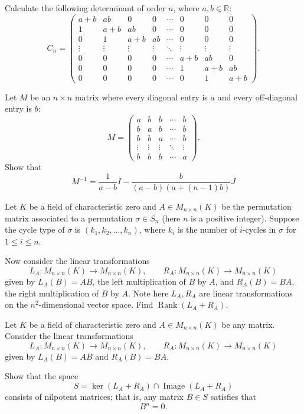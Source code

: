\documentclass[12pt]{article}
\begin{document}
\begin{problem}
Calculate the following determinant of order $n$, where $a,b\in\mathbb{R}$:
\[
C_n=\begin{pmatrix}
a+b & ab & 0 & 0 & \cdots & 0 & 0 & 0\\
1 & a+b & ab & 0 & \cdots & 0 & 0 & 0\\
0 & 1 & a+b & ab & \cdots & 0 & 0 & 0\\
\vdots & \vdots & \vdots & \vdots & \ddots & \vdots & \vdots & \vdots\\
0 & 0 & 0 & 0 & \cdots & a+b & ab & 0\\
0 & 0 & 0 & 0 & \cdots & 1 & a+b & ab\\
0 & 0 & 0 & 0 & \cdots & 0 & 1 & a+b
\end{pmatrix}.
\]
\end{problem}

\begin{problem}
Let $M$ be an $n\times n$ matrix where every diagonal entry is $a$ and every off-diagonal entry is $b$:
\[
M=\begin{pmatrix}
a & b & b & \cdots & b\\
b & a & b & \cdots & b\\
b & b & a & \cdots & b\\
\vdots & \vdots & \vdots & \ddots & \vdots\\
b & b & b & \cdots & a
\end{pmatrix}.
\]
Show that
\[
M^{-1} = \frac{1}{a-b}I - \frac{b}{(a-b)(a+(n-1)b)}J
\]
\end{problem}

\begin{problem}
Let $K$ be a field of characteristic zero and $A\in M_{n\times n}(K)$ be the permutation
matrix associated to a permutation $\sigma\in S_n$ (here $n$ is a positive integer).
Suppose the cycle type of $\sigma$ is $(k_1,k_2,\ldots,k_n)$, where $k_i$ is the number
of $i$-cycles in $\sigma$ for $1\le i\le n$.

Now consider the linear transformations
\[
L_A:M_{n\times n}(K)\longrightarrow M_{n\times n}(K),
\qquad
R_A:M_{n\times n}(K)\longrightarrow M_{n\times n}(K)
\]
given by $L_A(B)=AB$, the left multiplication of $B$ by $A$, and
$R_A(B)=BA$, the right multiplication of $B$ by $A$.
Note here $L_A,R_A$ are linear transformations on the $n^2$-dimensional vector space.
Find $\operatorname{Rank}(L_A+R_A)$.
\end{problem}

\begin{problem}
Let $K$ be a field of characteristic zero and $A\in M_{n\times n}(K)$ be any matrix.
Consider the linear transformations
\[
L_A:M_{n\times n}(K)\longrightarrow M_{n\times n}(K),
\qquad
R_A:M_{n\times n}(K)\longrightarrow M_{n\times n}(K)
\]
given by $L_A(B)=AB$ and $R_A(B)=BA$.

Show that the space
\[
S=\ker(L_A+R_A)\cap\operatorname{Image}(L_A+R_A)
\]
consists of nilpotent matrices; that is, any matrix $B\in S$ satisfies that
\[
B^n=0.
\]
\end{problem}
\end{document}
